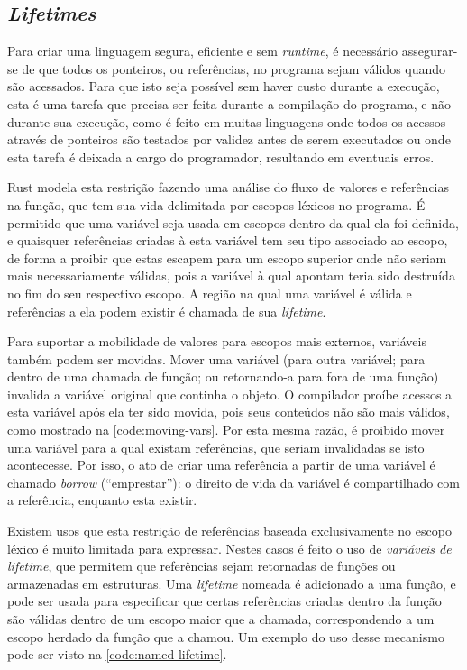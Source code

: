 \documentclass[tg]{mdtufsm}
\begin{document}
\subsection{\emph{Lifetimes}}

Para criar uma linguagem segura, eficiente e sem \emph{runtime}, é necessário assegurar-se de que todos os ponteiros, ou referências, no programa sejam válidos quando são acessados. Para que isto seja possível sem haver custo durante a execução, esta é uma tarefa que precisa ser feita durante a compilação do programa, e não durante sua execução, como é feito em muitas linguagens onde todos os acessos através de ponteiros são testados por validez antes de serem executados ou onde esta tarefa é deixada a cargo do programador, resultando em eventuais erros.

Rust modela esta restrição fazendo uma análise do fluxo de valores e referências na função, que tem sua vida delimitada por escopos léxicos no programa. É permitido que uma variável seja usada em escopos dentro da qual ela foi definida, e quaisquer referências criadas à esta variável tem seu tipo associado ao escopo, de forma a proibir que estas escapem para um escopo superior onde não seriam mais necessariamente válidas, pois a variável à qual apontam teria sido destruída no fim do seu respectivo escopo. A região na qual uma variável é válida e referências a ela podem existir é chamada de sua \emph{lifetime}.

Para suportar a mobilidade de valores para escopos mais externos, variáveis também podem ser movidas. Mover uma variável (para outra variável; para dentro de uma chamada de função; ou retornando-a para fora de uma função) invalida a variável original que continha o objeto. O compilador proíbe acessos a esta variável após ela ter sido movida, pois seus conteúdos não são mais válidos, como mostrado na \autoref{code:moving-vars}. Por esta mesma razão, é proibido mover uma variável para a qual existam referências, que seriam invalidadas se isto acontecesse. Por isso, o ato de criar uma referência a partir de uma variável é chamado \emph{borrow} (``emprestar''): o direito de vida da variável é compartilhado com a referência, enquanto esta existir.

Existem usos que esta restrição de referências baseada exclusivamente no escopo léxico é muito limitada para expressar. Nestes casos é feito o uso de \emph{variáveis de lifetime}, que permitem que referências sejam retornadas de funções ou armazenadas em estruturas. Uma \emph{lifetime} nomeada é adicionado a uma função, e pode ser usada para especificar que certas referências criadas dentro da função são válidas dentro de um escopo maior que a chamada, correspondendo a um escopo herdado da função que a chamou. Um exemplo do uso desse mecanismo pode ser visto na \autoref{code:named-lifetime}. \citep{rust-lifetimes}
\end{document}
